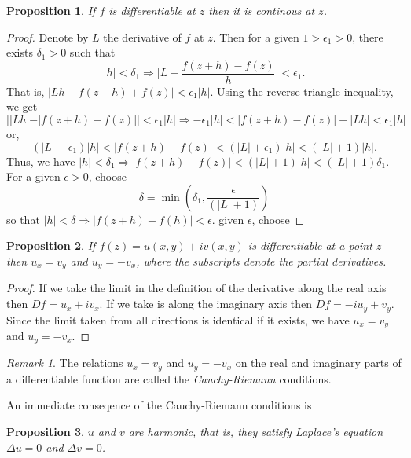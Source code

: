 \documentclass{article}
\theoremstyle{plain}
\numberwithin{thm}{section}
\theoremstyle{plain}
\newtheorem{prop}{Proposition}
\numberwithin{prop}{section}
\theoremstyle{plain}
\numberwithin{prop}{section}
\theoremstyle{definition}
\numberwithin{defn}{section}
\theoremstyle{remark}
\newtheorem*{rem}{Remark}
\numberwithin{equation}{section}
\begin{document}
\begin{prop}\label{s2p2}
If $f$ is differentiable at $z$ then it is continous at $z$.
\end{prop}
\begin{proof}
Denote by $L$ the derivative of $f$ at $z$. Then for a given $1 > \epsilon_1 > 0$,
there exists $\delta_1 > 0$ such that 
\[
|h| < \delta_1 \Rightarrow \Bigg|L - \frac{f(z+h) - f(z)}{h}\Bigg| < \epsilon_1.
\]
That is, $|Lh - f(z+h) + f(z)| < \epsilon_1 |h|$. Using the reverse triangle
inequality, we get
\[
||Lh| - |f(z+h) - f(z)|| < \epsilon_1 |h| \Rightarrow -\epsilon_1 |h| < 
|f(z+h)-f(z)| - |Lh| < \epsilon_1 |h| 
\]
or,
\[
(|L| - \epsilon_1)|h| < |f(z+h) - f(z)| < (|L| + \epsilon_1)|h| < (|L| + 1)|h|.
\]
Thus, we have $|h| < \delta_1 \Rightarrow |f(z+h) - f(z)| < (|L| + 1)|h| <
(|L| + 1)\delta_1$. For a given $\epsilon > 0$, choose 
\[
\delta = \min\left(\delta_1, \frac{\epsilon}{(|L|+1)}\right)
\]
so that $|h| < \delta \Rightarrow |f(z+h) - f(h)| < \epsilon$.
given $\epsilon$, choose
\end{proof}

\begin{prop}\label{s2p3}
If $f(z) = u(x, y) + iv(x, y)$ is differentiable at a point $z$ then $u_x = v_y$
and $u_y = -v_x$, where the subscripts denote the partial derivatives.
\end{prop}
\begin{proof}
If we take the limit in the definition of the derivative along the real axis 
then $Df = u_x + iv_x$. If we take is along the imaginary axis then $Df = -iu_y
+ v_y$. Since the limit taken from all directions is identical if it exists,
we have $u_x = v_y$ and $u_y = -v_x$.
\end{proof}

\begin{rem}
The relations $u_x = v_y$ and $u_y = -v_x$ on the real and imaginary parts of
a differentiable function are called the \emph{Cauchy-Riemann} conditions.
\end{rem}

An immediate conseqence of the Cauchy-Riemann conditions is 
\begin{prop}\label{s2p4}
$u$ and $v$ are harmonic, that is, they satisfy Laplace's equation $\Delta u=0$
and $\Delta v = 0$.
\end{prop}
\end{document}
